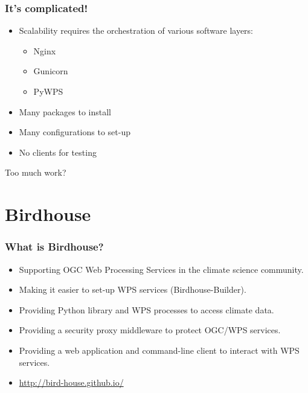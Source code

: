 \documentclass{beamer}
\begin{document}
\begin{frame}
\frametitle<presentation>{It's complicated!}

\begin{itemize}

  \item Scalability requires the orchestration of various software layers:
   \begin{itemize}
	  \item Nginx
	  \item Gunicorn
	  \item PyWPS
	\end{itemize}
  \item Many packages to install
  \item Many configurations to set-up
  \item No clients for testing
\end{itemize}

\vspace{0.4cm}
\centering
\Large{Too much work?}

\end{frame}


\section{Birdhouse}

\begin{frame}
\frametitle<presentation>{What is Birdhouse?}

\begin{itemize}
  \item Supporting OGC Web Processing Services in the climate science community.
  \item Making it easier to set-up WPS services (Birdhouse-Builder).
  \item Providing Python library and WPS processes to access climate data.
  \item Providing a security proxy middleware to protect OGC/WPS services.
  \item Providing a web application and command-line client to interact with WPS services.
  \item \url{http://bird-house.github.io/}

\end{itemize}
\end{frame}
\end{document}
